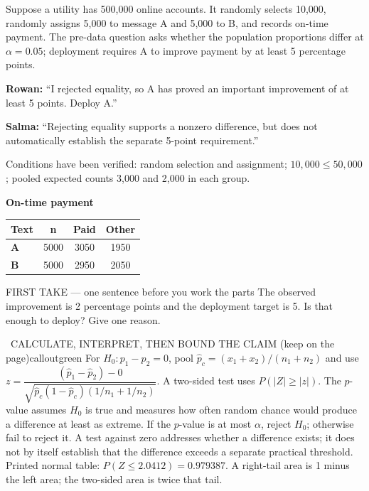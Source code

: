 \documentclass[11pt]{article}
\begin{document}


Suppose a utility has 500,000 online accounts. It randomly selects 10,000, randomly assigns 5,000 to message A and 5,000 to B, and records on-time payment. The pre-data question asks whether the population proportions differ at $\alpha=0.05$; deployment requires A to improve payment by at least 5 percentage points.\par\smallskip \textbf{Rowan:} ``I rejected equality, so A has proved an important improvement of at least 5 points. Deploy A.''\par \textbf{Salma:} ``Rejecting equality supports a nonzero difference, but does not automatically establish the separate 5-point requirement.''\par\smallskip Conditions have been verified: random selection and assignment; $10{,}000\leq50{,}000$; pooled expected counts 3,000 and 2,000 in each group.\par
\begin{center}
\textbf{On-time payment}\par\smallskip
\begin{tabular}{|l|c|c|c|}
\hline
\textbf{Text} & \textbf{n} & \textbf{Paid} & \textbf{Other} \\ \hline
\textbf{A} & 5000 & 3050 & 1950 \\ \hline
\textbf{B} & 5000 & 2950 & 2050 \\ \hline
\end{tabular}
\end{center}
\begin{firsttakebox}{FIRST TAKE --- one sentence before you work the parts}
The observed improvement is 2 percentage points and the deployment target is 5. Is that enough to deploy? Give one reason.
\workspace{0.9in}
\end{firsttakebox}

\begin{callout}{\IconBook\ CALCULATE, INTERPRET, THEN BOUND THE CLAIM (keep on the page)}{calloutgreen}
For $H_0:p_1-p_2=0$, pool $\hat p_c=(x_1+x_2)/(n_1+n_2)$ and use
$z=\dfrac{(\hat p_1-\hat p_2)-0}{\sqrt{\hat p_c(1-\hat p_c)(1/n_1+1/n_2)}}$.
A two-sided test uses $P(|Z|\ge |z|)$. The $p$-value assumes $H_0$ is true and measures
how often random chance would produce a difference at least as extreme. If the $p$-value is at most $\alpha$, reject
$H_0$; otherwise fail to reject it. A test against zero addresses whether a difference exists;
it does not by itself establish that the difference exceeds a separate practical threshold.
Printed normal table: $P(Z\leq2.0412)=0.979387$. A right-tail area is 1 minus the left area; the two-sided area is twice that tail.
\end{callout}
\end{document}
